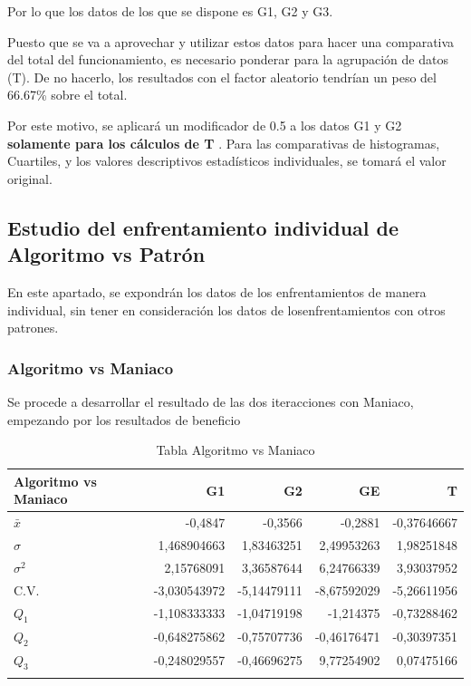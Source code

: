 Por lo que los datos de los que se dispone es G1, G2 y G3. 

Puesto que se va a aprovechar y utilizar estos datos para hacer una comparativa del total del funcionamiento, es necesario ponderar para la agrupación de datos (T). De no hacerlo, los resultados con el factor aleatorio tendrían un peso del 66.67\% sobre el total.

Por este motivo, se aplicará un modificador de 0.5 a los datos G1 y G2 \textbf{solamente para los cálculos de T} . Para las comparativas de histogramas, Cuartiles, y los valores descriptivos estadísticos individuales, se tomará el valor original.

\subsection{Estudio del enfrentamiento individual de Algoritmo vs Patrón}
\label{sec:AvP}

En este apartado, se expondrán los datos de los enfrentamientos de manera individual, sin tener en consideración los datos de losenfrentamientos con otros patrones. 

\subsubsection{Algoritmo vs Maniaco}

Se procede a desarrollar el resultado de las dos iteracciones con Maniaco, empezando por los resultados de beneficio

\begin{longtable}[c]{lrrrr}
\hline
Algoritmo vs Maniaco & G1 & G2 & GE & T \\ \hline
$\bar{x}$ & -0,4847 & -0,3566 & -0,2881 & -0,37646667 \\ 
$\sigma$ & 1,468904663 & 1,83463251 & 2,49953263 & 1,98251848 \\ 
$\sigma^2$  & 2,15768091 & 3,36587644 & 6,24766339 & 3,93037952 \\ 
C.V. & -3,030543972 & -5,14479111 & -8,67592029 & -5,26611956 \\ 
$Q_1$ & -1,108333333 & -1,04719198 & -1,214375 & -0,73288462 \\
$Q_2$ & -0,648275862 & -0,75707736 & -0,46176471 & -0,30397351 \\ 
$Q_3$ & -0,248029557 & -0,46696275 & 9,77254902 & 0,07475166 \\ \hline
\caption{Tabla Algoritmo vs Maniaco}
\label{tab:AvM}
\end{longtable}


